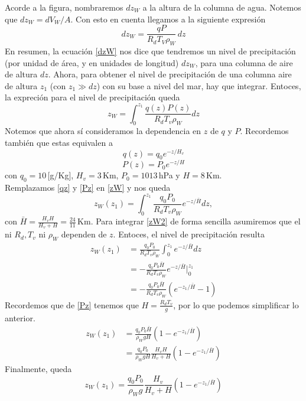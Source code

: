 \documentclass[class=article, crop=false]{standalone}
\begin{document}
Acorde a la figura, nombraremos $dz_W$ a la altura de la columna de agua. Notemos que $dz_W = dV_W/A$. Con esto en cuenta llegamos a la siguiente expresión
\begin{equation}
   dz_W = \frac{qP}{R_dT_V \rho_W}\,dz \label{dzW} 
\end{equation}
En resumen, la ecuación \eqref{dzW} nos dice que tendremos un nivel de precipitación (por unidad de área, y en unidades de longitud) $dz_W$, para una columna de aire de altura $dz$. Ahora, para obtener el nivel de precipitación de una columna aire de altura $z_1$ (con $z_1 \gg dz$) con su base a nivel del mar, hay que integrar. Entoces, la expreción para el nivel de precipitación queda
\begin{equation}
    z_W = \int_0^{z_1} \frac{q(z)P(z)}{R_d T_v \rho_W} dz \label{zW}
\end{equation}
Notemos que ahora sí consideramos la dependencia en $z$ de $q$ y $P$. Recordemos también que estas equivalen a
\begin{equation}
    q(z) = q_0 e^{-z/H_v} \label{qz}
\end{equation}
\begin{equation}
    P(z) = P_0 e^{-z/H} \label{Pz}
\end{equation}
con $q_0 = 10\,$[g/Kg], $H_v = 3\,$Km, $P_0 = 1013\,$hPa y $H = 8\,$Km.\\ 

Remplazamos \eqref{qz} y \eqref{Pz} en \eqref{zW} y nos queda
\begin{equation}
    z_W(z_1) = \int_0^{z_1} \frac{q_0 P_0}{R_d T_v \rho_W} e^{-z/\bar{H}} dz \label{zW2}
,\end{equation}
con $\bar{H} = \frac{H_v H}{H_v + H} = \frac{24}{11}\,$Km. Para integrar \eqref{zW2} de forma sencilla asumiremos que el ni $R_d, T_v$ ni $\rho_W$ dependen de $z$. Entoces, el nivel de precipitación resulta
\begin{align*}
    z_W(z_1) &= \frac{q_0 P_0}{R_d T_v \rho_W} \int_0^{z_1}  e^{-z/\bar{H}} dz \label{zW2}\\
        &= - \frac{q_0 P_0\bar{H}}{R_d T_v \rho_W}  e^{-z/\bar{H}}\Bigg|_{0}^{z_1}\\
        &= - \frac{q_0 P_0\bar{H}}{R_d T_v \rho_W}(e^{-z_1/\bar{H}} - 1)
\end{align*}
Recordemos que de \eqref{Pz} tenemos que $H = \frac{R_d T_v}{g}$, por lo que podemos simplificar lo anterior.
\begin{align*}
    z_W(z_1) &= \frac{q_0 P_0 \bar{H}}{\rho_W g H} (1 - e^{-z_1/\bar{H}})\\
             &= \frac{q_0 P_0}{\rho_W g H} \frac{H_v H}{H_v + H} (1 - e^{-z_1/\bar{H}})
\end{align*}
Finalmente, queda
\begin{equation}
    z_W(z_1) = \frac{q_0 P_0}{\rho_W g} \frac{H_v}{H_v + H} (1- e^{-z_1/\bar{H}})
\end{equation}
\end{document}
